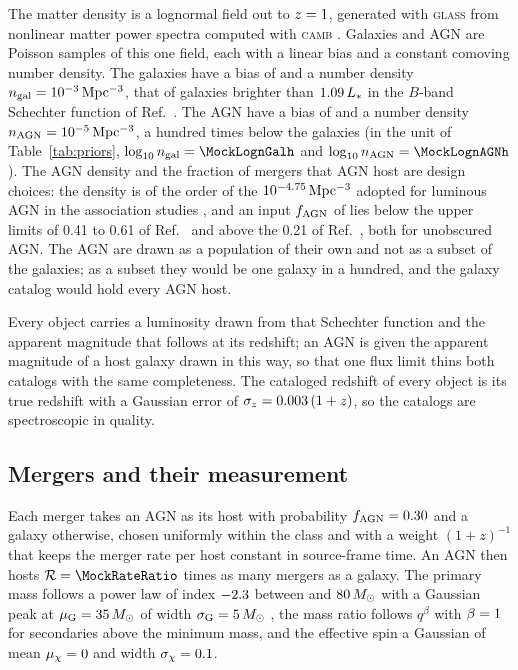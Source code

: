 \documentclass[aps,prd,reprint,twocolumn,superscriptaddress,nofootinbib,floatfix,nolongbibliography]{revtex4-2}
\newcommand{\msun}{\,M_\odot}
\newcommand{\fagn}{f_{\rm AGN}}
\newcommand{\ngal}{n_{\rm gal}}
\newcommand{\nagn}{n_{\rm AGN}}
\newcommand{\rr}{\mathcal{R}}
\begin{document}
The matter density is a lognormal field out to $z=1$, generated with
\textsc{glass} \cite{Tessore:2023zyk} from nonlinear matter power spectra
computed with \textsc{camb} \cite{Lewis:1999bs}. Galaxies and AGN are Poisson
samples of this one field, each with a linear bias and a constant comoving
number density. The galaxies have a bias of \MockbGal{} and a number density
$\ngal=\MocknGal\,{\rm Mpc^{-3}}$, that of galaxies brighter than
$1.09\,L_\ast$ in the $B$-band Schechter function of
Ref.~\cite{Gehrels:2015uga}. The AGN have a bias of \MockbAGN{} and a number
density $\nagn=\MocknAGN\,{\rm Mpc^{-3}}$, a hundred times below the
galaxies (in the unit of Table~\ref{tab:priors}, $\log_{10}\ngal=\MockLognGalh$
and $\log_{10}\nagn=\MockLognAGNh$). The AGN density and the fraction of
mergers that AGN host are design choices: the density is of the order of the
$10^{-4.75}\,{\rm Mpc^{-3}}$ adopted for luminous AGN in the association
studies
\cite{Veronesi:2022hql,Bom:2023zgw}, and an input $\fagn$ of \MockfAGN{} lies
below the upper limits of 0.41 to 0.61 of Ref.~\cite{Pouw:2026lar} and above
the 0.21 of Ref.~\cite{Veronesi:2024tef}, both for unobscured AGN. The
AGN are drawn as a population of
their own and not as a subset of the galaxies; as a subset they would be one
galaxy in a hundred, and the galaxy catalog would hold every AGN host.

Every object carries a luminosity drawn from that Schechter function and
the apparent magnitude that follows at its redshift; an
AGN is given the apparent magnitude of a host galaxy drawn in this way, so
that one flux limit thins both catalogs with the same completeness. The
cataloged redshift of every object is its true redshift with a Gaussian
error of $\sigma_z=0.003\,(1+z)$, so the catalogs are spectroscopic in
quality.

\subsection{Mergers and their measurement}
\label{sec:events}

Each merger takes an AGN as its host with probability $\fagn=\MockfAGN$ and a
galaxy otherwise, chosen uniformly within the class and with a weight
$(1+z)^{-1}$ that keeps the merger rate per host constant in source-frame
time. An AGN then hosts $\rr=\MockRateRatio$ times as many mergers as a
galaxy. The primary mass follows a power law of index $-2.3$ between
\MockMmin{} and $\MockMmax\msun$ with a Gaussian peak at $\mu_{\rm
G}=\MockMuG\msun$ of width $\sigma_{\rm G}=\MockSigmaG\msun$
\cite{Talbot:2018cva}, the mass ratio follows $q^{\beta}$ with
$\beta=1$ for secondaries above the minimum mass, and the effective
spin a Gaussian of mean $\mu_\chi=0$ and width
$\sigma_\chi=0.1$.
\end{document}
